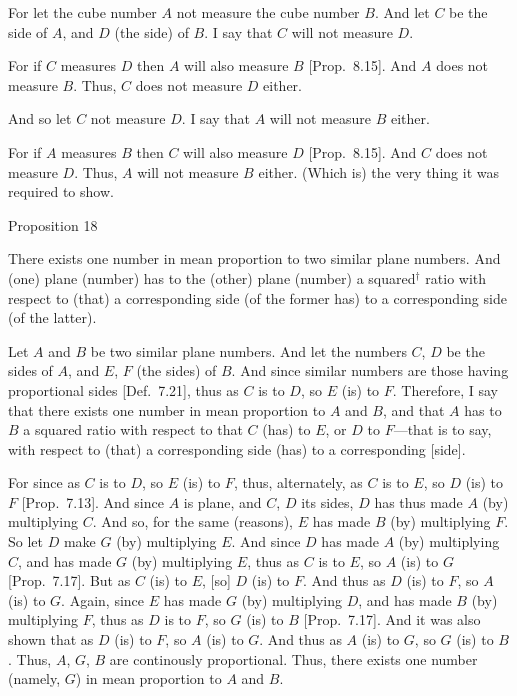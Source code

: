 For let the cube number $A$ not measure the cube number $B$.
And let $C$ be the side of $A$, and $D$ (the side) of $B$.
I say that  $C$ will not measure $D$.

For if $C$ measures $D$ then $A$ will also measure $B$
[Prop.~8.15]. And $A$ does not measure $B$. Thus,
$C$ does not measure $D$ either.

And so let $C$ not measure $D$. I say that $A$ will not measure $B$
either.

For if $A$ measures $B$ then $C$ will also measure $D$ [Prop.~8.15]. And $C$ does not measure $D$.
Thus, $A$ will not measure $B$ either. (Which is) the very thing it was required to show.


\begin{center}
{\large Proposition 18}
\end{center}

There exists one number in mean proportion to
two similar plane numbers. And (one) plane (number)
has to the (other) plane (number) a squared$^\dag$ ratio with respect to (that)
a corresponding side (of the former has) to a corresponding side (of the latter).

\centerline{}

Let $A$ and $B$ be two similar plane numbers. And let the numbers $C$, $D$ be the
sides of $A$, and $E$, $F$ (the sides) of $B$. And since similar
numbers are those having proportional sides [Def.~7.21], thus as $C$ is to $D$, so
$E$ (is) to $F$. Therefore, I say that there exists one number in mean proportion
to $A$ and $B$, and that $A$ has to $B$ a squared ratio with
respect to that $C$ (has) to $E$, or $D$ to $F$---that is to say, with respect to
(that) a
corresponding side (has) to a corresponding [side].

For since as $C$ is to $D$, so $E$ (is) to $F$, thus, alternately, 
as $C$ is to $E$, so $D$ (is) to $F$ [Prop.~7.13].
And since $A$ is  plane, and $C$, $D$ its sides, $D$ has
thus made $A$ (by) multiplying $C$. And so, for the same (reasons),
$E$ has made $B$ (by) multiplying $F$.  So let $D$ make
$G$ (by) multiplying $E$. And since $D$ has made $A$ (by) multiplying
$C$, and has made $G$ (by) multiplying $E$, thus as $C$ is to
$E$, so $A$ (is) to $G$ [Prop.~7.17].
But as $C$ (is) to $E$, [so] $D$ (is) to $F$. And thus as $D$ (is) to  $F$,
so $A$ (is) to $G$. Again, since $E$ has made $G$ (by) multiplying
$D$, and has made $B$ (by) multiplying $F$, thus as $D$ is to $F$, so
$G$ (is) to $B$ [Prop.~7.17]. And it was
also shown that as $D$ (is) to $F$, so $A$ (is) to $G$. And thus as 
$A$ (is) to $G$, so $G$ (is) to $B$.  Thus, $A$, $G$, $B$ are continously
proportional. Thus, there exists one number (namely, $G$) in mean proportion to $A$ and $B$.

